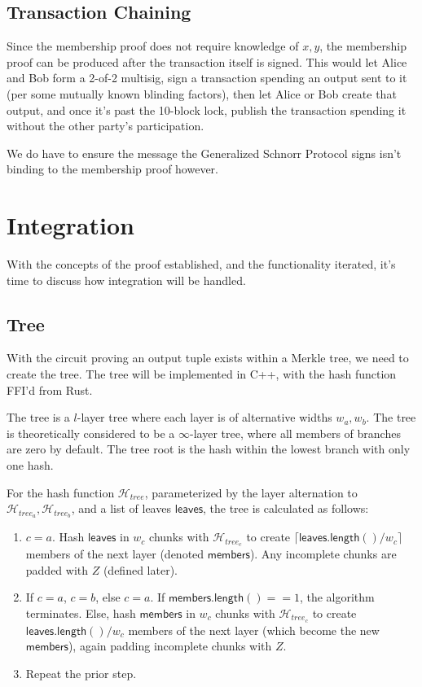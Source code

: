 \documentclass[]{article}
\begin{document}
\subsection{Transaction Chaining}

Since the membership proof does not require knowledge of $x, y$, the membership proof can be produced after the transaction itself is signed. This would let Alice and Bob form a 2-of-2 multisig, sign a transaction spending an output sent to it (per some mutually known blinding factors), then let Alice or Bob create that output, and once it's past the 10-block lock, publish the transaction spending it without the other party's participation.

We do have to ensure the message the Generalized Schnorr Protocol signs isn't binding to the membership proof however.

\section{Integration}

With the concepts of the proof established, and the functionality iterated, it's time to discuss how integration will be handled.

\subsection{Tree}

With the circuit proving an output tuple exists within a Merkle tree, we need to create the tree. The tree will be implemented in C++, with the hash function FFI'd from Rust.

The tree is a $l$-layer tree where each layer is of alternative widths $w_a, w_b$. The tree is theoretically considered to be a $\infty$-layer tree, where all members of branches are zero by default. The tree root is the hash within the lowest branch with only one hash.

For the hash function $\mathcal{H}_{tree}$, parameterized by the layer alternation to $\mathcal{H}_{tree_a}, \mathcal{H}_{tree_b}$, and a list of leaves $\mathsf{leaves}$, the tree is calculated as follows:

\begin{enumerate}
	\item $c = a$. Hash $\mathsf{leaves}$ in $w_c$ chunks with $\mathcal{H}_{tree_c}$ to create $\lceil \mathsf{leaves.length()} / w_c \rceil$ members of the next layer (denoted $\mathsf{members}$). Any incomplete chunks are padded with $Z$ (defined later).
	\item If $c = a$, $c = b$, else $c = a$. If $\mathsf{members.length()} == 1$, the algorithm terminates. Else, hash $\mathsf{members}$ in $w_c$ chunks with $\mathcal{H}_{tree_c}$ to create $\mathsf{leaves.length()} / w_c$ members of the next layer (which become the new $\mathsf{members}$), again padding incomplete chunks with $Z$.
	\item Repeat the prior step.
\end{enumerate}
\end{document}
